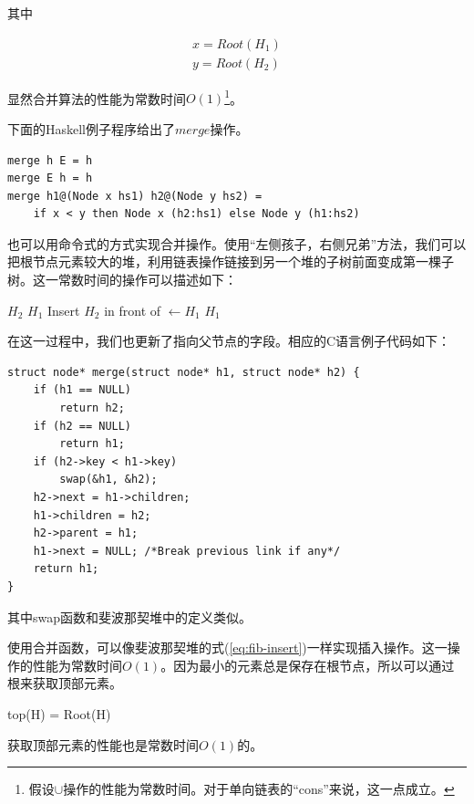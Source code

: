 \documentclass[b5paper]{ctexart}
\begin{document}
其中

\[
\begin{array}{l}
x = Root(H_1) \\
y = Root(H_2)
\end{array}
\]

显然合并算法的性能为常数时间$O(1)$\footnote{假设$\cup$操作的性能为常数时间。对于单向链表的“cons”来说，这一点成立。}。

下面的Haskell例子程序给出了$merge$操作。

\lstset{language=Haskell}
\begin{lstlisting}[style=Haskell]
merge h E = h
merge E h = h
merge h1@(Node x hs1) h2@(Node y hs2) =
    if x < y then Node x (h2:hs1) else Node y (h1:hs2)
\end{lstlisting}

也可以用命令式的方式实现合并操作。使用“左侧孩子，右侧兄弟”方法，我们可以把根节点元素较大的堆，利用链表操作链接到另一个堆的子树前面变成第一棵子树。这一常数时间的操作可以描述如下：

\begin{algorithmic}[1]
    \State \Return $H_2$
  \EndIf
    \State \Return $H_1$
  \EndIf
    \State {}
  \EndIf
  \State Insert $H_2$ in front of 
  \State {} $\gets H_1$
  \State \Return $H_1$
\EndFunction
\end{algorithmic}

在这一过程中，我们也更新了指向父节点的字段。相应的C语言例子代码如下：

\lstset{language=C}
\begin{lstlisting}
struct node* merge(struct node* h1, struct node* h2) {
    if (h1 == NULL)
        return h2;
    if (h2 == NULL)
        return h1;
    if (h2->key < h1->key)
        swap(&h1, &h2);
    h2->next = h1->children;
    h1->children = h2;
    h2->parent = h1;
    h1->next = NULL; /*Break previous link if any*/
    return h1;
}
\end{lstlisting}

其中swap函数和斐波那契堆中的定义类似。

使用合并函数，可以像斐波那契堆的式(\ref{eq:fib-insert})一样实现插入操作。这一操作的性能为常数时间$O(1)$。因为最小的元素总是保存在根节点，所以可以通过根来获取顶部元素。

\be
top(H) = Root(H)
\ee

获取顶部元素的性能也是常数时间$O(1)$的。
\end{document}
